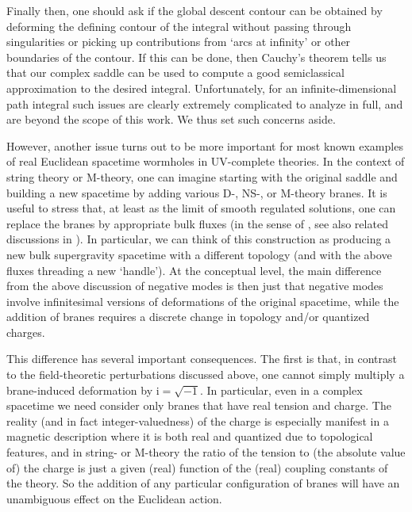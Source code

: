 \documentclass[11pt]{article}
\renewcommand{\i}{\mathrm{i}}
\begin{document}
Finally then, one should ask if the global descent contour can be obtained by deforming the defining contour of the integral without passing through singularities or picking up contributions from `arcs at infinity' or other boundaries of the contour.
If this can be done, then Cauchy's theorem tells us that our complex saddle can be used to compute a good semiclassical approximation to the desired integral.
Unfortunately, for an infinite-dimensional path integral such issues are clearly extremely complicated to analyze in full, and are beyond the scope of this work.
We thus set such concerns aside.

However, another issue turns out to be more important for most known examples of real Euclidean spacetime wormholes in UV-complete theories.
In the context of string theory or M-theory, one can imagine starting with the original saddle and building a new spacetime by adding various D-, NS-, or M-theory branes.
It is useful to stress that, at least as the limit of smooth regulated solutions, one can replace the branes by appropriate bulk fluxes (in the sense of \cite{Polchinski:1995mt}, see also related discussions in \cite{Kaplan:1995cp,Simon:2011rw}).  
In particular, we can think of this construction as producing a new bulk supergravity spacetime with a different topology (and with the above fluxes threading a new `handle').
At the conceptual level, the main difference from the above discussion of negative modes is then just that negative modes involve infinitesimal versions of  deformations of the original spacetime, while the addition of branes requires a discrete change in topology and/or quantized charges.

This difference has several important consequences.
The first is that, in contrast to the field-theoretic perturbations discussed above, one cannot simply multiply a brane-induced deformation by $\i=\sqrt{-1}$.
In particular, even in a complex spacetime we need consider only branes that have real tension and charge.
The reality (and in fact integer-valuedness) of the charge is especially manifest in a magnetic description where it is both real and quantized due to topological features, and in string- or M-theory the ratio of the tension to (the absolute value of) the charge is just a given (real) function of the (real) coupling constants of the theory.
So the addition of any particular configuration of branes will have an unambiguous effect on the Euclidean action.
\end{document}
